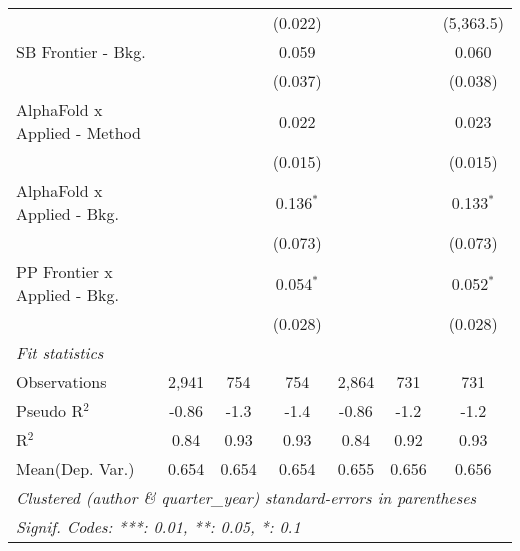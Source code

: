 \begin{tabular}{lcccccc}
                                &              &         & (0.022)      &              &             & (5,363.5)\\   
   SB Frontier - Bkg.           &              &         & 0.059        &              &             & 0.060\\   
                                &              &         & (0.037)      &              &             & (0.038)\\   
   AlphaFold x Applied - Method &              &         & 0.022        &              &             & 0.023\\   
                                &              &         & (0.015)      &              &             & (0.015)\\   
   AlphaFold x Applied - Bkg.   &              &         & 0.136$^{*}$  &              &             & 0.133$^{*}$\\   
                                &              &         & (0.073)      &              &             & (0.073)\\   
   PP Frontier x Applied - Bkg. &              &         & 0.054$^{*}$  &              &             & 0.052$^{*}$\\   
                                &              &         & (0.028)      &              &             & (0.028)\\   
   \midrule
   \emph{Fit statistics}\\
   Observations                 & 2,941        & 754     & 754          & 2,864        & 731         & 731\\  
   Pseudo R$^2$                 & -0.86        & -1.3    & -1.4         & -0.86        & -1.2        & -1.2\\  
   R$^2$                        & 0.84         & 0.93    & 0.93         & 0.84         & 0.92        & 0.93\\  
Mean(Dep. Var.) & 0.654 & 0.654 & 0.654 & 0.655 & 0.656 & 0.656 \\
   \midrule \midrule
   \multicolumn{7}{l}{\emph{Clustered (author \& quarter\_year) standard-errors in parentheses}}\\
   \multicolumn{7}{l}{\emph{Signif. Codes: ***: 0.01, **: 0.05, *: 0.1}}\\
\end{tabular}
\par\endgroup
